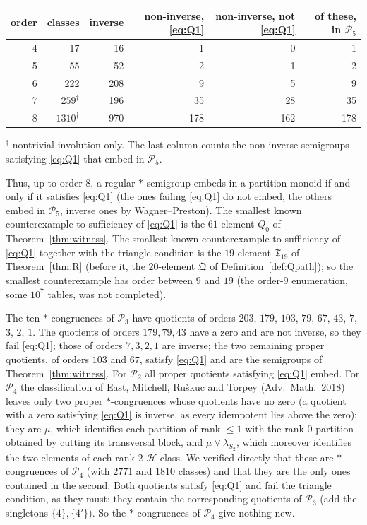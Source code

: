 \documentclass[11pt]{amsart}
\theoremstyle{definition}
\newcommand{\Hh}{\mathcal{H}}
\renewcommand{\P}{\mathcal{P}}
\begin{document}
\begin{center}
\begin{tabular}{@{}rrrrrr@{}}
\toprule
order & classes & inverse & non-inverse, \eqref{eq:Q1} & non-inverse, not \eqref{eq:Q1} & of these, in $\P_5$\\
\midrule
4 & 17 & 16 & 1 & 0 & 1\\
5 & 55 & 52 & 2 & 1 & 2\\
6 & 222 & 208 & 9 & 5 & 9\\
7 & $259^{\dagger}$ & 196 & 35 & 28 & 35\\
8 & $1310^{\dagger}$ & 970 & 178 & 162 & 178\\
\bottomrule
\end{tabular}

\smallskip
{\small $^\dagger$ nontrivial involution only. The last column counts the non-inverse semigroups satisfying \eqref{eq:Q1} that embed in $\P_5$.}
\end{center}

Thus, up to order $8$, a regular $*$-semigroup embeds in a partition monoid if and only if it satisfies \eqref{eq:Q1} (the ones failing \eqref{eq:Q1} do not embed, the others embed in $\P_5$, inverse ones by Wagner--Preston). The smallest known counterexample to sufficiency of \eqref{eq:Q1} is the $61$-element $Q_0$ of Theorem~\ref{thm:witness}. The smallest known counterexample to sufficiency of \eqref{eq:Q1} together with the triangle condition is the $19$-element $\mathfrak T_{19}$ of Theorem~\ref{thm:R} (before it, the $20$-element $\mathfrak Q$ of Definition~\ref{def:Qpath}); so the smallest counterexample has order between $9$ and $19$ (the order-$9$ enumeration, some $10^7$ tables, was not completed).

The ten $*$-congruences of $\P_3$ have quotients of orders $203$, $179$, $103$, $79$, $67$, $43$, $7$, $3$, $2$, $1$. The quotients of orders $179,79,43$ have a zero and are not inverse, so they fail \eqref{eq:Q1}; those of orders $7,3,2,1$ are inverse; the two remaining proper quotients, of orders $103$ and $67$, satisfy \eqref{eq:Q1} and are the semigroups of Theorem~\ref{thm:witness}. For $\P_2$ all proper quotients satisfying \eqref{eq:Q1} embed. For $\P_4$ the classification of East, Mitchell, Ru\v skuc and Torpey (Adv.\ Math.\ 2018) leaves only two proper $*$-congruences whose quotients have no zero (a quotient with a zero satisfying \eqref{eq:Q1} is inverse, as every idempotent lies above the zero); they are $\mu$, which identifies each partition of rank $\le1$ with the rank-$0$ partition obtained by cutting its transversal block, and $\mu\vee\lambda_{S_2}$, which moreover identifies the two elements of each rank-$2$ $\Hh$-class. We verified directly that these are $*$-congruences of $\P_4$ (with $2771$ and $1810$ classes) and that they are the only ones contained in the second. Both quotients satisfy \eqref{eq:Q1} and fail the triangle condition, as they must: they contain the corresponding quotients of $\P_3$ (add the singletons $\{4\},\{4'\}$). So the $*$-congruences of $\P_4$ give nothing new.
\end{document}
